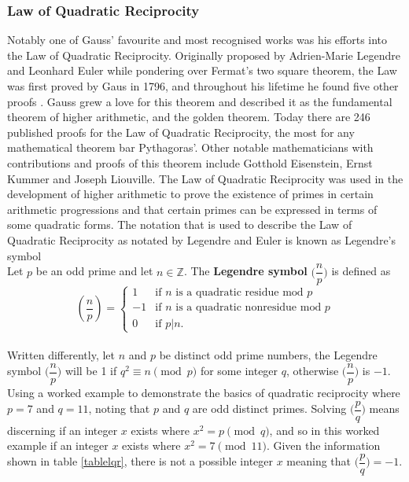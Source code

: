 \documentclass{article}
\newcommand{\Z}{{\mathbb Z}}
\begin{document}
\subsubsection{Law of Quadratic Reciprocity}
Notably one of Gauss' favourite and most recognised works was his efforts into the Law of Quadratic Reciprocity. Originally proposed by Adrien-Marie Legendre and Leonhard Euler while pondering over Fermat's two square theorem, the Law was first proved by Gaus in 1796, and throughout his lifetime he found five other proofs \cite{lawqr}. Gauss grew a love for this theorem and described it as the fundamental theorem of higher arithmetic, and the golden theorem. Today there are 246 published proofs for the Law of Quadratic Reciprocity, the most for any mathematical theorem bar Pythagoras'. Other notable mathematicians with contributions and proofs of this theorem include Gotthold Eisenstein, Ernst Kummer and Joseph Liouville. The Law of Quadratic Reciprocity was used in the development of higher arithmetic to prove the existence of primes in certain arithmetic progressions and that certain primes can be expressed in terms of some quadratic forms. The notation that is used to describe the Law of Quadratic Reciprocity as notated by Legendre and Euler is known as Legendre's symbol \cite{lawqr}
\\
Let $p$ be an odd prime and let $n \in \Z$. The \textbf{Legendre symbol} \(\bigg( \dfrac{n}{p} \bigg)\) is defined as
\[\left(\frac{n}{p}\right) = \left\{ \begin{array}{rl} 1 & \mbox{if } n \mbox{ is a quadratic residue mod } p\\
-1 & \mbox{if } n \mbox{ is a quadratic nonresidue mod } p \\
0 & \mbox{if } p|n.
  \end{array} \right.  \]
\\
Written differently, let $n$ and $p$ be distinct odd prime numbers, the Legendre symbol $\bigg( \dfrac{n}{p}\bigg)$ will be 1 if $q^2 \equiv n \pmod{p}$ for some integer \(q\), otherwise $\bigg( \dfrac{n}{p}\bigg)$ is \(-1\).
\\
Using a worked example to demonstrate the basics of quadratic reciprocity where $p=7$ and $q=11$, noting that $p$ and $q$ are odd distinct primes.
Solving $\bigg( \dfrac{p}{q}\bigg)$ means discerning if an integer $x$ exists where $x^2=p \pmod{q}$, and so in this worked example if an integer $x$ exists where $x^2 = 7 \pmod{11}$. Given the information shown in table \ref{tablelqr}, there is not a possible integer $x$ meaning that $\bigg( \dfrac{p}{q}\bigg) = -1$.
\end{document}
